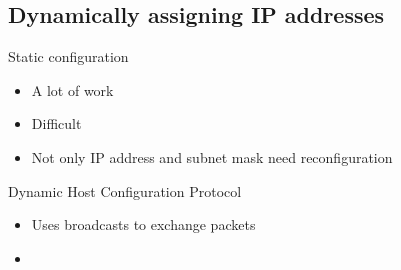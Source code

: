 \subsection{Dynamically assigning IP addresses}

\begin{frame}{Static configuration}
\begin{itemize}[<+->]
\item A lot of work
\item Difficult
\item Not only IP address and subnet mask need reconfiguration
\end{itemize}

\end{frame}



\begin{frame}{Dynamic Host Configuration Protocol}
\begin{itemize}[<+->]
\item Uses \alert{broadcasts} to exchange packets
\item 
\end{itemize}
\end{frame}
